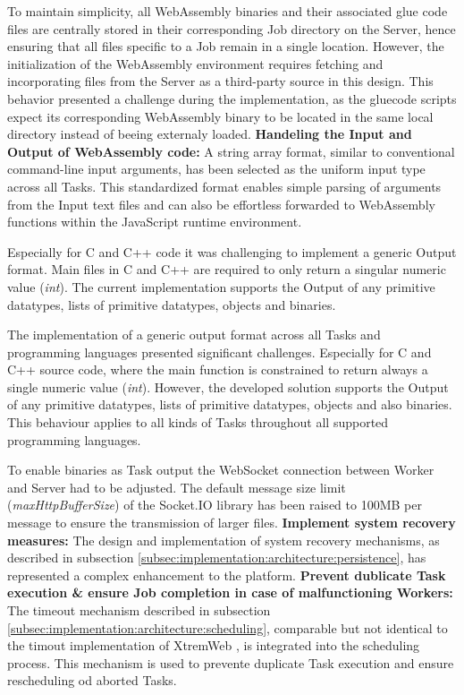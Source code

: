 To maintain simplicity, all WebAssembly binaries and their associated glue code files are centrally stored in their corresponding Job directory on the Server, hence ensuring that all files specific to a Job remain in a single location. However, the initialization of the WebAssembly environment requires fetching and incorporating files from the Server as a third-party source in this design. This behavior presented a challenge during the implementation, as the gluecode scripts expect its corresponding WebAssembly binary to be located in the same local directory instead of beeing externaly loaded.
\newline
\newline
\textbf{Handeling the Input and Output of WebAssembly code:}
\newline
A string array format, similar to conventional command-line input arguments, has been selected as the uniform input type across all Tasks. This standardized format enables simple parsing of arguments from the Input text files and can also be effortless forwarded to WebAssembly functions within the JavaScript runtime environment.

Especially for C and C++ code it was challenging to implement a generic Output format. Main files in C and C++ are required to only return a singular numeric value (\emph{int}). The current implementation supports the Output of any primitive datatypes, lists of primitive datatypes, objects and binaries.

The implementation of a generic output format across all Tasks and programming languages presented significant challenges. Especially for C and C++ source code, where the main function is constrained to return always a single numeric value (\emph{int}). However, the developed solution supports the Output of any primitive datatypes, lists of primitive datatypes, objects and also binaries. This behaviour applies to all kinds of Tasks throughout all supported programming languages.

To enable binaries as Task output the WebSocket connection between Worker and Server had to be adjusted. The default message size limit (\emph{maxHttpBufferSize}) of the Socket.IO library has been raised to 100MB per message to ensure the transmission of larger files.
\newline
\newline
\textbf{Implement system recovery measures:}
\newline
The design and implementation of system recovery mechanisms, as described in subsection \ref{subsec:implementation:architecture:persistence}, has represented a complex enhancement to the platform.
\newline
\newline
\textbf{Prevent dublicate Task execution \& ensure Job completion in case of malfunctioning Workers:}
\newline
The timeout mechanism described in subsection \ref{subsec:implementation:architecture:scheduling}, comparable but not identical to the timout implementation of XtremWeb \cite{relatedwork:xtremweb}, is integrated into the scheduling process. This mechanism is used to prevente duplicate Task execution and ensure rescheduling od aborted Tasks.